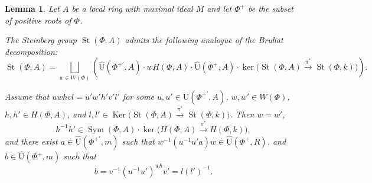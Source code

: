 \documentclass[oneside, 10pt]{amsart}
\DeclareMathOperator{\St}{St}
\DeclareMathOperator{\Sym}{Sym}
\DeclareMathOperator{\Ker}{Ker}
\newcommand{\UU}{\hat{\mathrm{U}}}      %
\numberwithin{equation}{section}
\newtheorem{lemma}{Lemma}
\numberwithin{lemma}{section}
\theoremstyle{definition}
\theoremstyle{remark}
\begin{document}
\begin{lemma}\label{lem:bruhat}
Let $A$ be a local ring with maximal ideal $M$ and let $\Phi^+$ be the subset of positive roots of $\Phi$.
\begin{lemlist}
\item The Steinberg group $\St(\Phi,A)$ admits the following analogue of the Bruhat decomposition:
\begin{equation}\label{eq:bruhat} \St(\Phi,A) =\bigsqcup_{w\in W(\Phi)} \left(\UU(\Phi^{+'}, A)\cdot wH(\Phi,A)\cdot\UU(\Phi^+, A) \cdot
                                  \ker\bigl(\St(\Phi,A) \xrightarrow{\pi^*} \St(\Phi,k)\bigr)\right). \end{equation}
\item Assume that $uwhvl=u'w'h'v'l'$ for some $u,u'\in \UU(\Phi^{+'}, A)$, $w,w'\in W(\Phi)$,
$h,h'\in H(\Phi,A)$, and $l,l'\in \Ker\bigl(\St(\Phi,A) \xrightarrow{\pi^*} \St(\Phi,k)\bigr)$. Then
$w=w'$,
$$ h^{-1}h'\in \Sym(\Phi,A)\cdot\ker\bigl(H(\Phi,A) \xrightarrow{\pi^*} H(\Phi,k)\bigr), $$
and there exist $a\in \UU(\Phi^{+'},m)$ such that $w^{-1}(u^{-1}u'a)w\in \UU(\Phi^+,R)$,
and $b\in\UU(\Phi^+,m)$ such that
$$ b=v^{-1}(u^{-1}u')^{wh}v'=l(l')^{-1}. $$
\end{lemlist}
\end{lemma}


\begin{comment}
\subsection{Various stuff}
\[ T_{ij}(at^{-1}) = \sigma_i T_{ij}(a) \sigma_i^{-1} = \sigma_j^{-1} T_{ij}(a) \sigma_j \]
\[ [[x_{ij}(a t^{-1}), x_{jk}(b t^{-1})],  x_{kl}(c)] = [x_{ik}(a b t^{-1}),  x_{kl}(c t^{-1})] \]
\[ \sigma_i [[x_{ij}(a), x_{jk}(b t^{-1})],  x_{kl}(c)] \sigma_i^{-1} =  \sigma_i [x_{ik}(a b),  x_{kl}(c t^{-1})] \sigma_i^{-1} \]
\begin{multline}
[[x_{ij}(at^{-1}), x_{jk}(bt^{-1})], x_{jl}(ct^{-1})] = \sigma_i [[ x_{ij}(a), x_{jk}(bt^{-1})], x_{jl}(ct^{-1})] \sigma_i^{-1} = \\
\sigma_i \sigma_k^{-1} \sigma_l^{-1} [[ x_{ij}(a), x_{jk}(b)], x_{jl}(c)] \sigma_l \sigma_k \sigma_i^{-1} = 1
\end{multline}
\[ [b, c] =1,\ [a^c, b] = c^{-1} a c b c^{-1} a^{-1} c b^{-1} =  c^{-1} a b  a^{-1} b^{-1} c = [a, b]^c \]

We need to prove that $\sigma_i$ commute with $x_{jk}(a)$ if $j\neq i, k \neq i$.
\end{comment}
\end{document}
